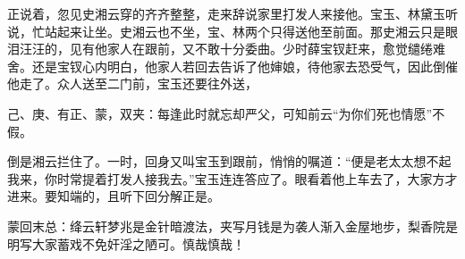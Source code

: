 \begin{parag}
    正说着，忽见史湘云穿的齐齐整整，走来辞说家里打发人来接他。宝玉、林黛玉听说，忙站起来让坐。史湘云也不坐，宝、林两个只得送他至前面。那史湘云只是眼泪汪汪的，见有他家人在跟前，又不敢十分委曲。少时薛宝钗赶来，愈觉缱绻难舍。还是宝钗心内明白，他家人若回去告诉了他婶娘，待他家去恐受气，因此倒催他走了。众人送至二门前，宝玉还要往外送，\begin{note}己、庚、有正、蒙，双夹：每逢此时就忘却严父，可知前云“为你们死也情愿”不假。\end{note}倒是湘云拦住了。一时，回身又叫宝玉到跟前，悄悄的嘱道：“便是老太太想不起我来，你时常提着打发人接我去。”宝玉连连答应了。眼看着他上车去了，大家方才进来。要知端的，且听下回分解正是。
\end{parag}


\begin{parag}
    \begin{note}蒙回末总：绛云轩梦兆是金针暗渡法，夹写月钱是为袭人渐入金屋地步，梨香院是明写大家蓄戏不免奸淫之陋可。慎哉慎哉！\end{note}
\end{parag}

